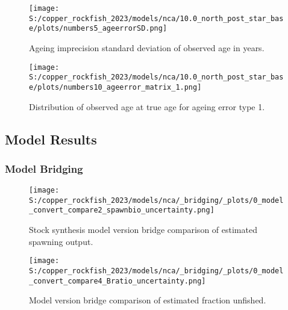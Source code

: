 \documentclass[11pt,
  letterpaper,
]{article}
\begin{document}
\pagebreak

\begin{figure}
{\centering
\texttt{[image: S:/copper\_rockfish\_2023/models/nca/10.0\_north\_post\_star\_base/plots/numbers5\_ageerrorSD.png]}
}
\caption{Ageing imprecision standard deviation of observed age in years.\label{fig:age-error}}
\end{figure}

\pagebreak

\begin{figure}
{\centering
\texttt{[image: S:/copper\_rockfish\_2023/models/nca/10.0\_north\_post\_star\_base/plots/numbers10\_ageerror\_matrix\_1.png]}
}
\caption{Distribution of observed age at true age for ageing error type 1.\label{fig:age-error-matrix}}
\end{figure}

\pagebreak

\subsection{Model Results}\label{model-results}

\subsubsection{Model Bridging}\label{model-bridging}

\begin{figure}
{\centering
\texttt{[image: S:/copper\_rockfish\_2023/models/nca/\_bridging/\_plots/0\_model\_convert\_compare2\_spawnbio\_uncertainty.png]}
}
\caption{Stock synthesis model version bridge comparison of estimated spawning output.\label{fig:bridge-ssb}}
\end{figure}

\pagebreak

\begin{figure}
{\centering
\texttt{[image: S:/copper\_rockfish\_2023/models/nca/\_bridging/\_plots/0\_model\_convert\_compare4\_Bratio\_uncertainty.png]}
}
\caption{Model version bridge comparison of estimated fraction unfished.\label{fig:bridge-depl}}
\end{figure}
\end{document}
